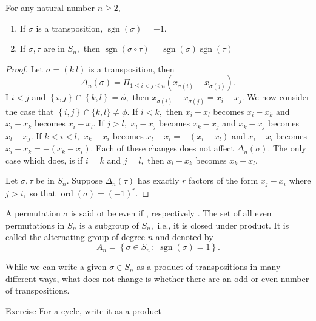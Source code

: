 \begin{theorem}[asd]
	For any natural number $ n \geq 2,$
	\begin{enumerate}
		\item If $ \sigma$ is a transposition, $ \operatorname{sgn} ( \sigma) = -1.$
		\item If $ \sigma, \tau$ are in $S_n,$ then $ \operatorname{sgn}( \sigma %
			\circ \tau) = \operatorname{sgn}( \sigma) \operatorname{sgn} ( \tau ) $
	\end{enumerate} 
\end{theorem}

\begin{proof}
	Let $ \sigma = (k \ l) $ is a transposition, then
	$$ \Delta_n( \sigma ) = \Pi _{1 \leq i < j \leq n} \left( x _{ \sigma(i) }
	 - x _{ \sigma(j)} \right).$$ 
	 I $i < j$ and $ \left\{ i, j  \right\}  \cap  \left\{ k,l \right\} = \phi,$
	 then $ x _{\sigma(i)} - x _{\sigma(j)} = x_i - x_j. $
	 We now consider the case that $ \left\{ i,j \right\} \cap \{ k, l \} \not = \phi.$
	 If $i < k ,$
	 then $x _i - x_ l $ becomes $x_i - x_k$ and $x_i - x_k$ becomes $x_i - x_l.$
	 If $j > l,$
	 $x_l - x_j$ becomes $x_k - x_j$ and
	 $x_k - x_j$ becomes $x_l - x_j.$
	 If $ k < i < l,$ $x_k - x_i$ becomes $x_l - x_i = -(x_i - x_l) $ 
	 and $ x_i  -x_l$ becomes $x_i - x_k = -(x_k - x_i).$
	Each of these changes does not affect $\Delta_n( \sigma).$
	 The only case which does, is if $i = k $ and $ j = l,$ then $ x_l - x_k$ becomes $x_k - x_l.$

	 Let $\sigma, \tau$ be in $S_n.$ Suppose $ \Delta_n( \tau)$ has exactly $r$ factors
	  of the form $x_j - x_i$ where $j > i,$ so that
	  $\operatorname{ ord} ( \sigma) = (-1) ^r.$ 
\end{proof}


\begin{definition}
	A permutation $ \sigma$ is said ot be even if , respectively .
	The set of all even permutations in $S_n$ is a subgroup of $S_n,$ i.e.,
	it is closed under product. It is called the alternating group of degree $n$
	and denoted by
	$$ A_n = \left\{  \sigma \in S_n \, : \; \operatorname{sgn}( \sigma) = 1 \right\}. $$
\end{definition}


\begin{remark}
	While we can write a given $ \sigma \in S_n$ as a product of transpositions in many different ways,
	what does not change is whether there are an odd or even number of transpositions.
\end{remark}

Exercise
For a cycle, write it as a product
